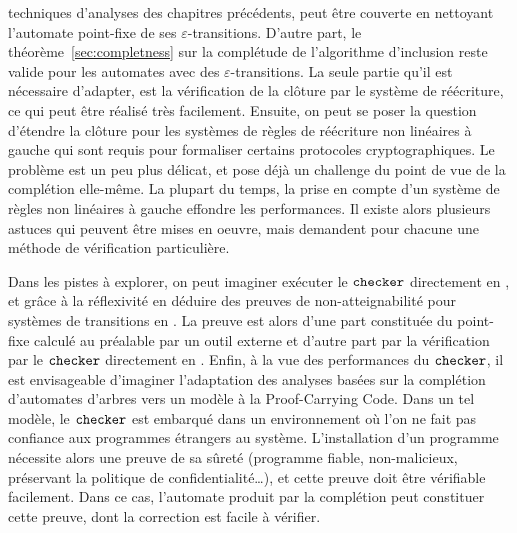 techniques d'analyses des chapitres précédents, peut être couverte en nettoyant l'automate
point-fixe de ses $\varepsilon$-transitions. %
D'autre part, le théorème~\ref{sec:completness} sur la complétude de l'algorithme
d'inclusion reste valide pour les automates avec des $\varepsilon$-transitions. La seule partie
qu'il est nécessaire d'adapter, est la vérification de la clôture par le système de réécriture,
ce qui peut être réalisé très facilement.
Ensuite, on peut se poser la question d'étendre la clôture pour les systèmes de règles
de réécriture non linéaires à gauche qui sont requis 
pour formaliser certains protocoles cryptographiques. Le problème est un peu plus délicat,
et pose déjà un challenge du point de vue de la complétion elle-même. La plupart du temps,
la prise en compte d'un système de règles non linéaires à gauche effondre les performances.
Il existe alors plusieurs astuces qui peuvent être mises en oeuvre, mais
demandent pour chacune une méthode de vérification particulière.

Dans les pistes à explorer, on peut imaginer exécuter le
$\mathtt{checker}$ directement en \coq, et grâce à la réflexivité en
déduire des preuves de non-atteignabilité pour systèmes de transitions
en \coq. La preuve est alors d'une part constituée du point-fixe
calculé au préalable par un outil externe et d'autre part par la
vérification par le $\mathtt{checker}$ directement en \coq.
Enfin, à la vue des performances du
$\mathtt{checker}$, il est envisageable d'imaginer l'adaptation des
analyses basées sur la complétion d'automates d'arbres vers un modèle
à la Proof-Carrying Code.  Dans un tel modèle, le $\mathtt{checker}$ est
embarqué dans un environnement où l'on ne fait pas confiance aux
programmes étrangers au système. L'installation d'un programme
nécessite alors une preuve de sa sûreté (programme fiable,
non-malicieux, préservant la politique de confidentialité\dots), et
cette preuve doit être vérifiable facilement. Dans ce cas, l'automate
produit par la complétion peut constituer cette preuve, dont la
correction est facile à vérifier.



